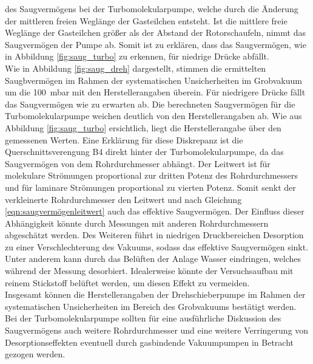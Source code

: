 des Saugvermögens bei der Turbomolekularpumpe, welche durch die Änderung der mittleren freien
Weglänge der Gasteilchen entsteht. Ist die mittlere freie Weglänge der Gasteilchen
größer als der Abstand der Rotorschaufeln, nimmt das Saugvermögen der Pumpe ab. Somit ist zu 
erklären, dass das Saugvermögen, wie in Abbildung \ref{fig:saug_turbo} zu erkennen, 
für niedrige Drücke abfällt.
\\
Wie in Abbildung \ref{fig:saug_dreh} dargestellt, stimmen die ermittelten Saugbvermögen im Rahmen 
der systematischen Unsicherheiten im Grobvakuum um die \SI{100}{\milli\bar} mit den Herstellerangaben 
überein. Für niedrigere Drücke fällt das Saugvermögen wie zu erwarten ab. 
Die berechneten Saugvermögen für die Turbomolekularpumpe weichen deutlich von den Herstellerangaben
ab. Wie aus Abbildung \ref{fig:saug_turbo} ersichtlich, liegt die Herstellerangabe über den gemessenen Werten.
Eine Erklärung für diese Diskrepanz ist die Querschnittsverengung B4 direkt hinter der Turbomolekularpumpe,
da das Saugvermögen von dem Rohrdurchmesser abhängt.
Der Leitwert ist für molekulare Strömungen proportional zur dritten Potenz des Rohrdurchmessers und für 
laminare Strömungen proportional zu vierten Potenz. 
Somit senkt der verkleinerte Rohrdurchmesser den Leitwert und nach Gleichung \ref{eqn:saugvermögenleitwert} 
auch das effektive Saugvermögen. Der Einfluss dieser Abhängigkeit könnte 
durch Messungen mit anderen Rohrdurchmessern abgeschätzt werden. 
Des Weiteren führt in niedrigen Druckbereichen Desorption zu einer Verschlechterung des Vakuums, sodass
das effektive Saugvermögen sinkt. Unter anderem kann durch das Belüften der Anlage Wasser eindringen, 
welches während der Messung desorbiert. Idealerweise könnte der Versuchsaufbau mit reinem Stickstoff 
belüftet werden, um diesen Effekt zu vermeiden.
\\
Insgesamt können die Herstellerangaben der Drehschieberpumpe im Rahmen der systematischen Unsicherheiten 
im Bereich des Grobvakuums bestätigt werden. 
Bei der Turbomolekularpumpe sollten für eine ausführliche Diskussion des 
Saugvermögens auch weitere Rohrdurchmesser und eine weitere Verringerung von Desorptionseffekten 
eventuell durch gasbindende Vakuumpumpen in Betracht gezogen werden.